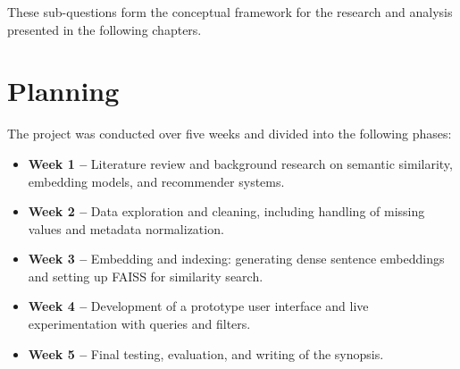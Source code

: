 These sub-questions form the conceptual framework for the research and analysis presented in the following chapters.

\section{Planning}
\label{sec:planning}

The project was conducted over five weeks and divided into the following phases:

\begin{itemize}
    \item \textbf{Week 1 –} Literature review and background research on semantic similarity, embedding models, and recommender systems.
    \item \textbf{Week 2 –} Data exploration and cleaning, including handling of missing values and metadata normalization.
    \item \textbf{Week 3 –} Embedding and indexing: generating dense sentence embeddings and setting up FAISS for similarity search.
    \item \textbf{Week 4 –} Development of a prototype user interface and live experimentation with queries and filters.
    \item \textbf{Week 5 –} Final testing, evaluation, and writing of the synopsis.
\end{itemize}

